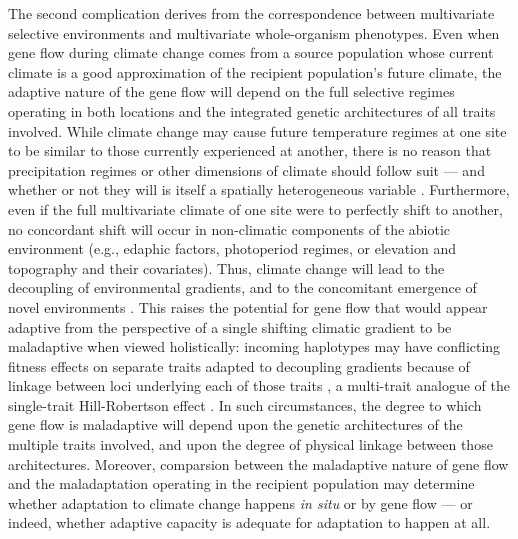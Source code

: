\documentclass[9pt,twocolumn,twoside,lineno]{pnas-new}
\begin{document}
The second complication derives from the correspondence between 
multivariate selective environments and multivariate whole-organism phenotypes. 
Even when gene 
flow during climate change comes from a source population whose current climate is a 
good approximation of the recipient population’s future climate, the adaptive nature 
of the gene flow will depend on the full selective regimes operating in both locations
and the integrated genetic architectures of all traits involved. 
While climate change may cause 
future temperature regimes at one site to be similar to those currently 
experienced at another, there is no reason that precipitation regimes or other
dimensions of climate should follow suit --- and whether or not they will is 
itself a spatially heterogeneous variable \cite{crimmins,daly}.
Furthermore, even if the full multivariate climate of one site were to 
perfectly shift to another, no concordant shift will occur in
non-climatic components of the abiotic environment (e.g., edaphic factors, photoperiod 
regimes, or elevation and topography and their covariates). 
Thus, climate change will 
lead to the decoupling of environmental gradients, 
and to the concomitant emergence of novel environments \cite{williams_novel_climates,williams_projected_novel_disappearing,fitzpatrick_climate_novelty_forecasts}. 
This raises the potential for gene flow that would appear adaptive
from the perspective of a single shifting climatic gradient
to be maladaptive when viewed holistically: 
incoming haplotypes may have conflicting fitness effects on separate traits
adapted to decoupling gradients
because of linkage between loci underlying each of those traits \cite{aitken_whitlock,schiffers},
a multi-trait analogue of the single-trait Hill-Robertson effect \cite{hill_robertson}. 
In such circumstances, the degree to which gene flow is maladaptive will depend
upon the genetic architectures of the multiple traits involved,
and upon the degree of physical linkage between those architectures.
Moreover, comparsion between the maladaptive nature of gene flow
and the maladaptation operating in the recipient population
may determine whether adaptation to climate change happens
\textit{in situ} or by gene flow --- or indeed,
whether adaptive capacity is adequate for adaptation to happen at all.
\end{document}
